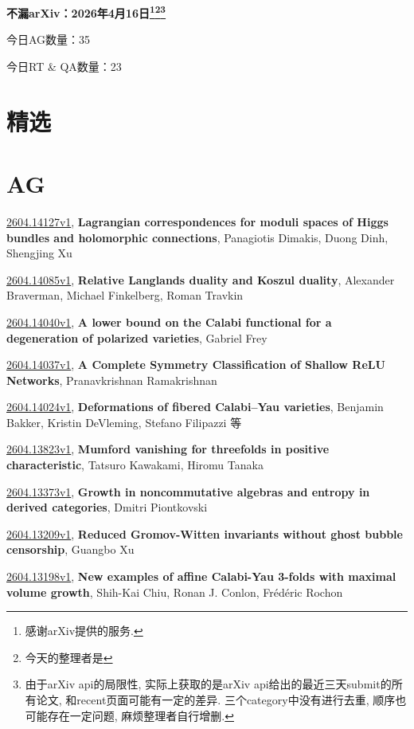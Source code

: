 \documentclass[9pt, a4paper]{article}
\theoremstyle{plain}
\theoremstyle{definition}
\theoremstyle{remark}
\newcommand{\arxiv}[3]{\href{https://arxiv.org/abs/#1}{#1}, \textbf{\textcolor{arxivblue}{#2}}, #3}
\newcommand{\AGnumber}{35}
\newcommand{\RTQAnumber}{23}
\newcommand{\NewestDate}{2026年4月16日}
\newcommand{\todayarXiver}{} %
\begin{document}
\begin{center}
    \Huge\textbf{不漏arXiv：\NewestDate\footnote{感谢arXiv提供的服务.}\footnote{今天的整理者是\todayarXiver}\footnote{由于arXiv api的局限性, 实际上获取的是arXiv api给出的最近三天submit的所有论文, 和recent页面可能有一定的差异. 三个category中没有进行去重, 顺序也可能存在一定问题, 麻烦整理者自行增删.}} \\
\end{center}

\setcounter{section}{-1}

\begin{center}
    今日AG数量：\AGnumber
    
    今日RT \& QA数量：\RTQAnumber
    
\end{center}


\section{精选}


\section{AG}
\arxiv{2604.14127v1}{Lagrangian correspondences for moduli spaces of Higgs bundles and holomorphic connections}{Panagiotis Dimakis, Duong Dinh, Shengjing Xu}

\arxiv{2604.14085v1}{Relative Langlands duality and Koszul duality}{Alexander Braverman, Michael Finkelberg, Roman Travkin}

\arxiv{2604.14040v1}{A lower bound on the Calabi functional for a degeneration of polarized varieties}{Gabriel Frey}

\arxiv{2604.14037v1}{A Complete Symmetry Classification of Shallow ReLU Networks}{Pranavkrishnan Ramakrishnan}

\arxiv{2604.14024v1}{Deformations of fibered Calabi--Yau varieties}{Benjamin Bakker, Kristin DeVleming, Stefano Filipazzi 等}

\arxiv{2604.13823v1}{Mumford vanishing for threefolds in positive characteristic}{Tatsuro Kawakami, Hiromu Tanaka}

\arxiv{2604.13373v1}{Growth in noncommutative algebras and entropy in derived categories}{Dmitri Piontkovski}

\arxiv{2604.13209v1}{Reduced Gromov-Witten invariants without ghost bubble censorship}{Guangbo Xu}

\arxiv{2604.13198v1}{New examples of affine Calabi-Yau 3-folds with maximal volume growth}{Shih-Kai Chiu, Ronan J. Conlon, Frédéric Rochon}
\end{document}

